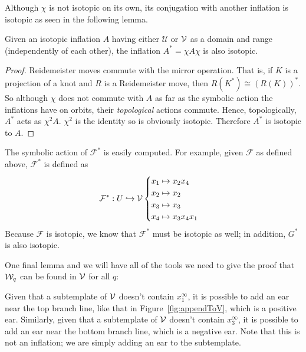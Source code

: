 \documentclass[paper.tex]{subfiles}
\begin{document}
    Although $\chi$ is not isotopic on its own, its conjugation with another inflation is isotopic as seen in the following lemma.

    \begin{lemma}[Ghrist 1997]
        Given an isotopic inflation $A$ having either $\mathcal{U}$ or $\mathcal{V}$ as a domain and range (independently of each other), the inflation $A^* = \chi A \chi$ is also isotopic.
    \end{lemma}

    \begin{proof}
      Reidemeister moves commute with the mirror operation. That is, if $K$ is a projection of a knot and $R$ is a Reidemeister move, then $R(K^\ast)  \cong  {(R(K))}^\ast$. So although $\chi$ does not commute with $A$ as far as the symbolic
      action the inflations have on orbits, their \emph{topological} actions commute. Hence, topologically, $A^\ast$ acts as $\chi^2 A$. $\chi^2$ is the identity so is obviously isotopic. Therefore $A^\ast$ is isotopic to $A$.
    \end{proof}



The symbolic action of $\mathcal{F}^\ast$ is easily computed. For example, given $\mathcal{F}$ as defined above, $\mathcal{F}^*$ is defined as $$\mathcal{F}^*: U \hookrightarrow \mathcal{V} \begin{cases} x_1 \mapsto x_2 x_4 \\ x_2 \mapsto x_2 \\ x_3 \mapsto x_3 \\ x_4 \mapsto x_3 x_4 x_1 \end{cases}$$ Because $\mathcal{F}$ is isotopic, we know that $\mathcal{F}^*$ must be isotopic as well; in addition, $G^*$ is also isotopic.

One final lemma and we will have all of the tools we need to give the proof that $\mathcal{W}_q$ can be found in $\mathcal{V}$ for all $q$:


\begin{lemma}[Ghrist 1997]

    Given that a subtemplate of $\mathcal{V}$ doesn't contain $x_1^\infty$, it is possible to add an ear near the top branch line, like that in Figure~\ref{fig:appendToV}, which is a positive ear. Similarly, given that a subtemplate of $\mathcal{V}$ doesn't contain $x_3^\infty$, it is possible to add an ear near the bottom branch line, which is a negative ear. Note that this is not an inflation; we are simply adding an ear to the subtemplate.\label{lemma:ear}
\end{lemma}
\end{document}
